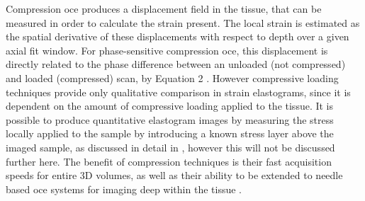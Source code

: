 Compression \ac{oce} produces a displacement field in the tissue, that can be measured in order to calculate the strain present. The local strain is estimated as the spatial derivative of these displacements with respect to depth \cite{kennedy_review_2014} over a given axial fit window. For phase-sensitive compression \ac{oce}, this displacement is directly related to the phase difference between an unloaded (not compressed) and loaded (compressed) scan, by Equation 2 \cite{kennedy_strain_2012}. However compressive loading techniques provide only qualitative comparison in strain elastograms, since it is dependent on the amount of compressive loading applied to the tissue. It is possible to produce quantitative elastogram images by measuring the stress locally applied to the sample by introducing a known stress layer above the imaged sample, as discussed in detail in \cite{kennedy_quantitative_2015}, however this will not be discussed further here. The benefit of compression techniques is their fast acquisition speeds for entire 3D volumes, as well as their ability to be extended to needle based \ac{oce} systems for imaging deep within the tissue \cite{kennedy_review_2014}. 

